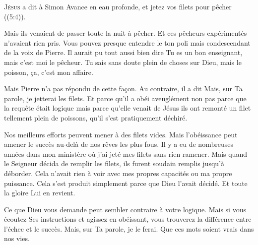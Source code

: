 



\lettrine{J}{ésus} a dit à Simon\frcolon{}
 \Og Avance en eau profonde, et jetez vos filets pour pêcher \Fg{}
 ((5:4)).

Mais ils venaient de passer toute la nuit à pêcher.
 Et ces pêcheurs expérimentés n'avaient rien pris.
 Vous pouvez presque entendre le ton poli mais condescendant
 de la voix de Pierre. Il aurait pu tout aussi bien dire\frcolon{} 
 \Og Tu es un bon enseignant, mais c'est moi le pêcheur.
 Tu sais sans doute plein de choses sur Dieu, mais le poisson,
 \c{c}a, c'est mon affaire. \Fg{}


Mais Pierre n'a pas répondu de cette fa\c{c}on.
 Au contraire, il a dit\frcolon{} 
 \Og Mais, sur Ta parole, je jetterai les filets. \Fg{}
 Et parce qu'il a obéi aveuglément \ocadr non pas parce que la requête était
 logique mais parce qu'elle venait de Jésus \fcadr{}
 ils ont remonté un filet tellement plein de poissons,
 qu'il s'est pratiquement déchiré.

Nos meilleurs efforts peuvent mener à des filets vides.
 Mais l'obéissance peut amener le succès au-delà de nos rêves les plus fous.
 Il y a eu de nombreuses années dans mon ministère où j'ai jeté mes filets
 sans rien ramener. Mais quand le Seigneur décida de remplir les filets,
 ils furent soudain remplis jusqu'à déborder.
 Cela n'avait rien à voir avec mes propres capacités ou ma propre puissance.
 Cela s'est produit simplement parce que Dieu l'avait décidé.
 Et toute la gloire Lui en revient.

Ce que Dieu vous demande peut sembler contraire à votre logique.
 Mais si vous écoutez Ses instructions et agissez en obéissant,
 vous trouverez la différence entre l'échec et le succès.
 \Og Mais, sur Ta parole, je le ferai. \Fg{}
 Que ces mots soient vrais dans nos vies.

\dvrule



